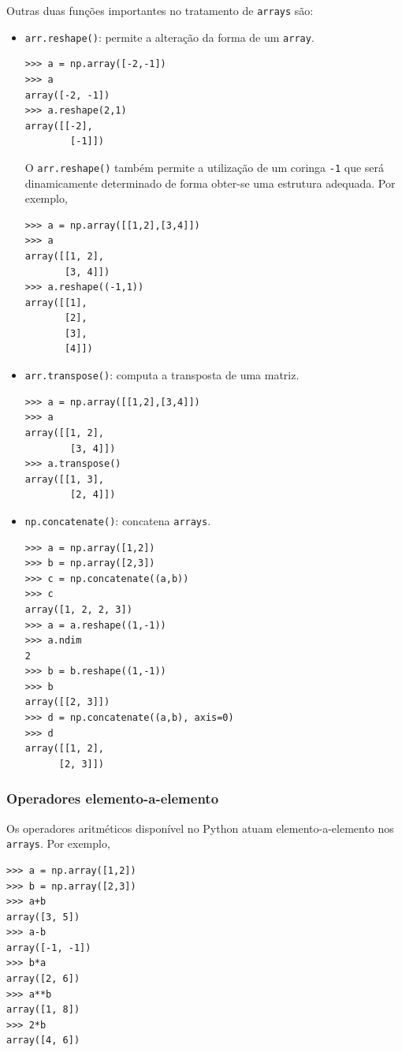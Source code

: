 \documentclass[12pt]{article}
\begin{document}
Outras duas funções importantes no tratamento de \lstinline+arrays+ são:
\begin{itemize}
\item \lstinline+arr.reshape()+: permite a alteração da forma de um \lstinline+array+.
  
\begin{lstlisting}
>>> a = np.array([-2,-1])
>>> a
array([-2, -1])
>>> a.reshape(2,1)
array([[-2],
        [-1]])
\end{lstlisting}

   O \lstinline+arr.reshape()+ também permite a utilização de um coringa \lstinline+-1+ que será dinamicamente determinado de forma obter-se uma estrutura adequada. Por exemplo,

\begin{lstlisting}
>>> a = np.array([[1,2],[3,4]])
>>> a
array([[1, 2],
       [3, 4]])
>>> a.reshape((-1,1))
array([[1],
       [2],
       [3],
       [4]])
\end{lstlisting}

\item \lstinline+arr.transpose()+: computa a transposta de uma matriz.

\begin{lstlisting}
>>> a = np.array([[1,2],[3,4]])
>>> a
array([[1, 2],
        [3, 4]])
>>> a.transpose()
array([[1, 3],
        [2, 4]])
\end{lstlisting}

    \item \lstinline+np.concatenate()+: concatena \lstinline+arrays+.

\begin{lstlisting}
>>> a = np.array([1,2])
>>> b = np.array([2,3])
>>> c = np.concatenate((a,b))
>>> c
array([1, 2, 2, 3])
>>> a = a.reshape((1,-1))
>>> a.ndim
2
>>> b = b.reshape((1,-1))
>>> b
array([[2, 3]])
>>> d = np.concatenate((a,b), axis=0)
>>> d
array([[1, 2],
      [2, 3]])
\end{lstlisting}

  \end{itemize}

\subsubsection{Operadores elemento-a-elemento}\label{subsubsection:ope-a-e}

Os operadores aritméticos disponível no Python atuam elemento-a-elemento nos \lstinline+arrays+. Por exemplo,

\begin{lstlisting}
>>> a = np.array([1,2])
>>> b = np.array([2,3])
>>> a+b
array([3, 5])
>>> a-b
array([-1, -1])
>>> b*a
array([2, 6])
>>> a**b
array([1, 8])
>>> 2*b
array([4, 6])
\end{lstlisting}
\end{document}
